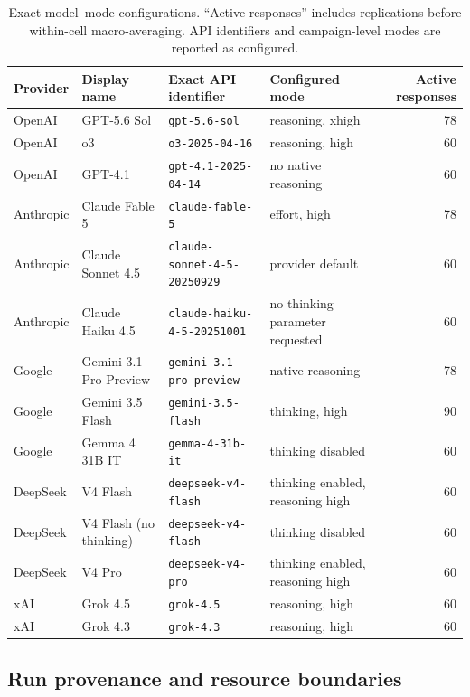 \documentclass[11pt,a4paper,twocolumn]{article}
\newcommand{\repo}[1]{\nolinkurl{#1}}
\begin{document}
\begin{table}[!t]
\centering
\caption{Exact model--mode configurations. ``Active responses'' includes
replications before within-cell macro-averaging. API identifiers and
campaign-level modes are reported as configured.}
\label{tab:models}
\scriptsize
\setlength{\tabcolsep}{3.5pt}
\renewcommand{\arraystretch}{1.04}
\begin{tabularx}{\textwidth}{P{1.45cm}P{3.35cm}P{4.55cm}Y r}
\toprule
\textbf{Provider} & \textbf{Display name} & \textbf{Exact API identifier} &
\textbf{Configured mode} & \textbf{Active responses} \\
\midrule
OpenAI & GPT-5.6 Sol & \repo{gpt-5.6-sol} & reasoning, xhigh & 78 \\
OpenAI & o3 & \repo{o3-2025-04-16} & reasoning, high & 60 \\
OpenAI & GPT-4.1 & \repo{gpt-4.1-2025-04-14} & no native reasoning & 60 \\
\addlinespace[1pt]
Anthropic & Claude Fable 5 & \repo{claude-fable-5} & effort, high & 78 \\
Anthropic & Claude Sonnet 4.5 & \repo{claude-sonnet-4-5-20250929} & provider default & 60 \\
Anthropic & Claude Haiku 4.5 & \repo{claude-haiku-4-5-20251001} & no thinking parameter requested & 60 \\
\addlinespace[1pt]
Google & Gemini 3.1 Pro Preview & \repo{gemini-3.1-pro-preview} & native reasoning & 78 \\
Google & Gemini 3.5 Flash & \repo{gemini-3.5-flash} & thinking, high & 90 \\
Google & Gemma 4 31B IT & \repo{gemma-4-31b-it} & thinking disabled & 60 \\
\addlinespace[1pt]
DeepSeek & V4 Flash & \repo{deepseek-v4-flash} & thinking enabled, reasoning high & 60 \\
DeepSeek & V4 Flash (no thinking) & \repo{deepseek-v4-flash} & thinking disabled & 60 \\
DeepSeek & V4 Pro & \repo{deepseek-v4-pro} & thinking enabled, reasoning high & 60 \\
\addlinespace[1pt]
xAI & Grok 4.5 & \repo{grok-4.5} & reasoning, high & 60 \\
xAI & Grok 4.3 & \repo{grok-4.3} & reasoning, high & 60 \\
\bottomrule
\end{tabularx}
\end{table}

\subsection{Run provenance and resource boundaries}
\end{document}
